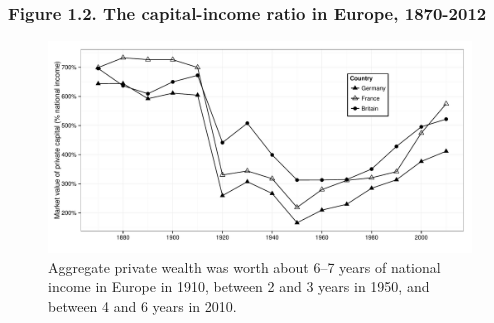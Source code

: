 \documentclass[t]{beamer}\usepackage[]{graphicx}\usepackage[]{color}
\newenvironment{knitrout}{}{} %
\begin{document}
\begin{frame}[label=Figure_1_2,fragile]
\frametitle{Figure 1.2. The capital-income ratio in Europe, 1870-2012}
\begin{figure}[t]
\begin{minipage}[b]{\textwidth}
\centering
\begin{knitrout}\footnotesize
{}\color{fgcolor}

{\centering \includegraphics[width=1\linewidth]{figures/bw/Figure_1_2} 

}



\end{knitrout}
\caption{Aggregate private wealth was worth about 6--7 years of national income in Europe in 1910, between 2 and 3 years in 1950, and between 4 and 6 years in 2010.}
\end{minipage}
\end{figure}
\end{frame}
\end{document}
